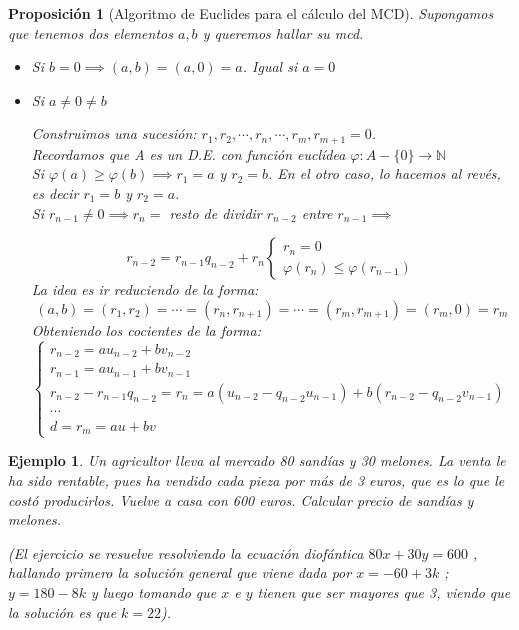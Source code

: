 \documentclass[11pt, a4paper, titlepage]{article}
\newif\IfInSansMode
\providecommand{\nat}{\mathbb{N}}
\theoremstyle{theorem-style}
\newtheorem{nprop}{Proposición}[section]
\theoremstyle{definition-style}
\theoremstyle{remark-style}
\theoremstyle{example-style}
\newtheorem{ejemplo}{Ejemplo}[section]
\begin{document}
\begin{nprop}[Algoritmo de Euclides para el cálculo del MCD]
Supongamos que tenemos dos elementos $a,b$ y queremos hallar su mcd.

\begin{itemize}

	\item Si $b=0 \implies (a,b) = (a,0) = a$. Igual si $a=0$

	\item Si $a \ne 0 \ne b$

	Construimos una sucesión: $r_1,r_2,\cdots, r_n, \cdots , r_m, r_{m+1} = 0$.\\
	Recordamos que A es un D.E. con función euclídea $\varphi : A-\{0\} \to \nat $\\
	Si $\varphi(a) \geq \varphi(b)\implies r_1 = a$ y $r_2 = b$. En el otro caso, lo hacemos al revés, es decir  $r_1 = b $ y $r_2 = a$.\\
	Si $r_{n-1} \ne 0 \implies r_n= $ resto de dividir $r_{n-2}$ entre $r_{n-1} \implies$

	\[
	r_{n-2} = r_{n-1}q_{n-2} + r_n \begin{cases}
	 r_n = 0 \\
	  \varphi(r_n) \leq \varphi(r_{n-1})
\end{cases}
	 \]
La idea es ir reduciendo de la forma:
\[ (a,b) = (r_1,r_2) = \cdots = (r_n,r_{n+1}) = \cdots = (r_m, r_{m+1}) = (r_m,0) = r_m\]
Obteniendo los cocientes de la forma:
\[\begin{cases}
	r_{n-2} = au_{n-2} + bv_{n-2}\\

r_{n-1} = au_{n-1} + bv_{n-1}\\

r_{n-2} - r_{n-1}q_{n-2} = r_n = a(u_{n-2} - q_{n-2}u_{n-1}) + b(r_{n-2}-q_{n-2}v_{n-1})\\
\cdots \\

d = r_m = au + bv
\end{cases}
\quad
\]

	\end{itemize}
\end{nprop}

\begin{ejemplo}
  Un agricultor lleva al mercado 80 sandías y 30 melones. La venta le ha sido rentable, pues ha vendido cada pieza por más de 3 euros, que es lo que le costó producirlos. Vuelve a casa con 600 euros. Calcular precio de sandías y melones.

	(El ejercicio se resuelve resolviendo la ecuación diofántica $80x +30y = 600$ , hallando primero la solución general que viene dada por $x = -60 + 3k$ ; $y = 180 - 8k$ y luego tomando que $x$ e $y$ tienen que ser mayores que 3, viendo que la solución es que $k=22$).
\end{ejemplo}
\end{document}
